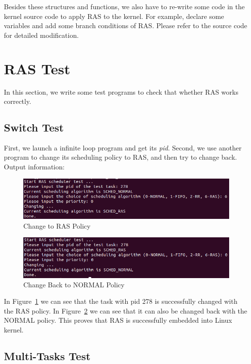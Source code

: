 Besides these structures and functions, we also have to re-write some code in the kernel source code to apply RAS to the kernel. For example, declare some variables and add some branch conditions of RAS. Please refer to the source code for detailed modification.

\section{RAS Test}

In this section, we write some test programs to check that whether RAS works correctly.

\subsection{Switch Test}

First, we launch a infinite loop program and get its \textit{pid}. Second, we use another program to change its scheduling policy to RAS, and then try to change back. Output information:

\begin{figure}[!htp]
  \centering
  \includegraphics[width=12cm]{figures/basictest1.png}
  \caption{Change to RAS Policy}
  \label{fig:basictest1}
\end{figure}

\begin{figure}[!htp]
  \centering
  \includegraphics[width=12cm]{figures/basictest2.png}
  \caption{Change Back to NORMAL Policy}
  \label{fig:basictest2}
\end{figure}

In Figure~\ref{fig:basictest1} we can see that the task with pid 278 is successfully changed with the RAS policy. In Figure~\ref{fig:basictest2} we can see that it can also be changed back with the NORMAL policy. This proves that RAS is successfully embedded into Linux kernel.

\subsection{Multi-Tasks Test}

